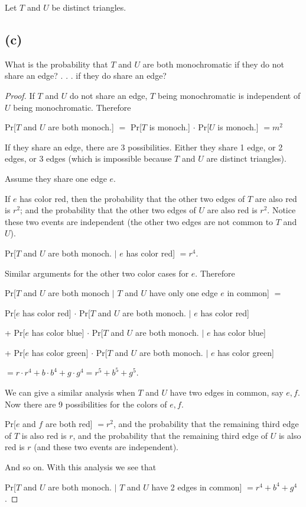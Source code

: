 \documentclass[14pt]{extarticle}
\begin{document}
Let $T$ and $U$ be distinct triangles.

\subsection{(c)}
What is the probability that $T$ and $U$ are both monochromatic if they do not share an edge? . . . if they do share an edge?
\begin{proof}
If $T$ and $U$ do not share an edge, $T$ being monochromatic is independent of $U$ being monochromatic. Therefore

Pr[$T$ and $U$ are both monoch.] $=$ Pr[$T$ is monoch.] $\cdot$ Pr[$U$ is monoch.] $ = m^2$

If they share an edge, there are 3 possibilities. Either they share 1 edge, or 2 edges, or 3 edges (which is impossible because $T$ and $U$ are distinct triangles).

Assume they share one edge $e$.

If $e$ has color red, then the probability that the other two edges of $T$ are also red is $r^2$; and the probability that the other two edges of $U$ are also red is $r^2$. Notice these two events are independent (the other two edges are not common to $T$ and $U$).

Pr[$T$ and $U$ are both monoch. $|$ $e$ has color red] $ = r^4$.

Similar arguments for the other two color cases for $e$. Therefore

Pr[$T$ and $U$ are both monoch $|$ $T$ and $U$ have only one edge $e$ in common] $=$ 

Pr[$e$ has color red] $\cdot$ Pr[$T$ and $U$ are both monoch. $|$ $e$ has color red]

+ Pr[$e$ has color blue] $\cdot$ Pr[$T$ and $U$ are both monoch. $|$ $e$ has color blue]

+ Pr[$e$ has color green] $\cdot$ Pr[$T$ and $U$ are both monoch. $|$ $e$ has color green]

$= r \cdot r^4 + b \cdot b^4 + g \cdot g^4 = r^5 + b^5 + g^5$.

We can give a similar analysis when $T$ and $U$ have two edges in common, say $e,f$. Now there are 9 possibilities for the colors of $e,f$.

Pr[$e$ and $f$ are both red] $ = r^2$, and the probability that the remaining third edge of $T$ is also red is $r$, and the probability that the remaining third edge of $U$ is also red is $r$ (and these two events are independent).

And so on. With this analysis we see that 

Pr[$T$ and $U$ are both monoch. $|$ $T$ and $U$ have 2 edges in common] $ = r^4 + b^4 + g^4$.
\end{proof}
\end{document}
